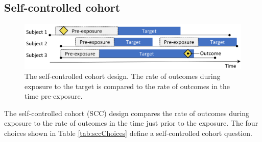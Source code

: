 \documentclass[11pt]{book}
\begin{document}
\subsection{Self-controlled cohort}\label{self-controlled-cohort}

\begin{figure}

{\centering \includegraphics[width=0.9\linewidth]{images/PopulationLevelEstimation/selfControlledCohort} 

}

\caption{The self-controlled cohort design. The rate of outcomes during exposure to the target is compared to the rate of outcomes in the time pre-exposure.}\label{fig:scc}
\end{figure}

The self-controlled cohort (SCC) design \citep{ryan_2013} compares the
rate of outcomes during exposure to the rate of outcomes in the time
just prior to the exposure. The four choices shown in Table
\ref{tab:sccChoices} define a self-controlled cohort question.
\end{document}
